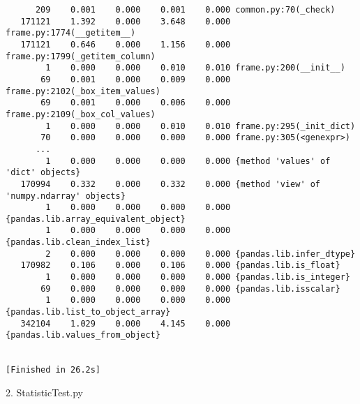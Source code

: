 \documentclass{article}
\begin{document}
\begin{verbatim}
      209    0.001    0.000    0.001    0.000 common.py:70(_check)
   171121    1.392    0.000    3.648    0.000 frame.py:1774(__getitem__)
   171121    0.646    0.000    1.156    0.000 frame.py:1799(_getitem_column)
        1    0.000    0.000    0.010    0.010 frame.py:200(__init__)
       69    0.001    0.000    0.009    0.000 frame.py:2102(_box_item_values)
       69    0.001    0.000    0.006    0.000 frame.py:2109(_box_col_values)
        1    0.000    0.000    0.010    0.010 frame.py:295(_init_dict)
       70    0.000    0.000    0.000    0.000 frame.py:305(<genexpr>)
      ...
        1    0.000    0.000    0.000    0.000 {method 'values' of 'dict' objects}
   170994    0.332    0.000    0.332    0.000 {method 'view' of 'numpy.ndarray' objects}
        1    0.000    0.000    0.000    0.000 {pandas.lib.array_equivalent_object}
        1    0.000    0.000    0.000    0.000 {pandas.lib.clean_index_list}
        2    0.000    0.000    0.000    0.000 {pandas.lib.infer_dtype}
   170982    0.106    0.000    0.106    0.000 {pandas.lib.is_float}
        1    0.000    0.000    0.000    0.000 {pandas.lib.is_integer}
       69    0.000    0.000    0.000    0.000 {pandas.lib.isscalar}
        1    0.000    0.000    0.000    0.000 {pandas.lib.list_to_object_array}
   342104    1.029    0.000    4.145    0.000 {pandas.lib.values_from_object}


[Finished in 26.2s]
\end{verbatim}
2. StatisticTest.py
\end{document}
